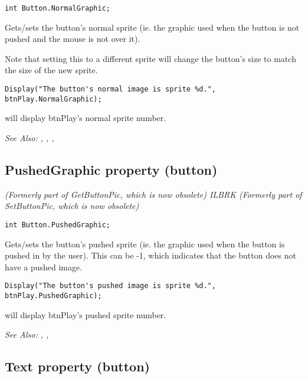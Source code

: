 \begin{verbatim}
int Button.NormalGraphic;
\end{verbatim}
Gets/sets the button's normal sprite (ie. the graphic used when the button is not pushed
and the mouse is not over it).

Note that setting this to a different sprite will change the button's size to match the size of the new sprite.

\begin{verbatim}
Display("The button's normal image is sprite %d.", btnPlay.NormalGraphic);
\end{verbatim}
will display btnPlay's normal sprite number.

\it{See Also:} 
,
,
,


\subsection{PushedGraphic property (button)}\label{Button.PushedGraphic}%

\it{(Formerly part of GetButtonPic, which is now obsolete)} ILBRK
\it{(Formerly part of SetButtonPic, which is now obsolete)}

\begin{verbatim}
int Button.PushedGraphic;
\end{verbatim}
Gets/sets the button's pushed sprite (ie. the graphic used when the button is pushed
in by the user). This can be -1, which indicates that the button does not have a pushed
image.

\begin{verbatim}
Display("The button's pushed image is sprite %d.", btnPlay.PushedGraphic);
\end{verbatim}
will display btnPlay's pushed sprite number.

\it{See Also:} ,
,


\subsection{Text property (button)}\label{Button.Text}%


